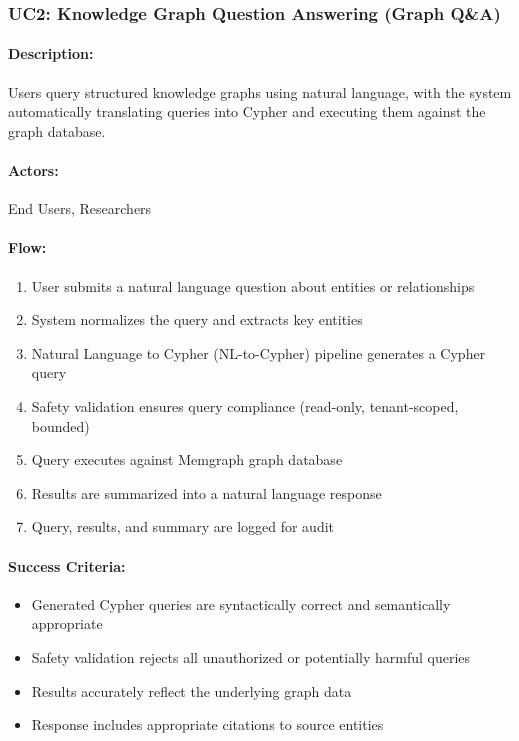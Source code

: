 \subsubsection{UC2: Knowledge Graph Question Answering (Graph Q\&A)}

\paragraph{Description:} Users query structured knowledge graphs using natural language, with the system automatically translating queries into Cypher and executing them against the graph database.

\paragraph{Actors:} End Users, Researchers

\paragraph{Flow:}
\begin{enumerate}
    \item User submits a natural language question about entities or relationships
    \item System normalizes the query and extracts key entities
    \item Natural Language to Cypher (NL-to-Cypher) pipeline generates a Cypher query
    \item Safety validation ensures query compliance (read-only, tenant-scoped, bounded)
    \item Query executes against Memgraph graph database
    \item Results are summarized into a natural language response
    \item Query, results, and summary are logged for audit
\end{enumerate}

\paragraph{Success Criteria:}
\begin{itemize}
    \item Generated Cypher queries are syntactically correct and semantically appropriate
    \item Safety validation rejects all unauthorized or potentially harmful queries
    \item Results accurately reflect the underlying graph data
    \item Response includes appropriate citations to source entities
\end{itemize}

